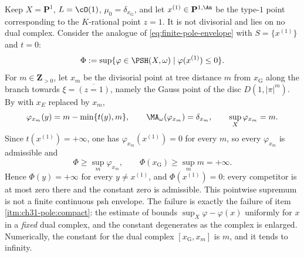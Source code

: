 \begin{example}
\label{ex:ch31-type-one-fails}
Keep $X=\mathbf P^1$, $L=\cO(1)$, $\mu_0=\delta_{x_{\mathrm G}}$, and
let $x^{(1)}\in\mathbf P^{1,\An}$ be the type-$1$ point corresponding to
the $K$-rational point $z=1$.  It is not divisorial and lies on no dual
complex.  Consider the analogue of \eqref{eq:finite-pole-envelope} with
$S=\{x^{(1)}\}$ and $t=0$:
\[
 \Phi:=\sup\{\varphi\in\PSH(X,\omega)\mid\varphi(x^{(1)})\leq0\} .
\]
For $m\in\mathbf Z_{>0}$, let $x_m$ be the divisorial point at tree
distance $m$ from $x_{\mathrm G}$ along the branch towards
$\xi=\overline{(z=1)}$, namely the Gauss point of the disc
$D(1,|\pi|^m)$.  By  with $x_E$ replaced by
$x_m$,
\[
 \varphi_{x_m}(y)=m-\min\{t(y),m\},
 \qquad
 \MA_\omega(\varphi_{x_m})=\delta_{x_m},
 \qquad
 \sup_X\varphi_{x_m}=m .
\]
Since $t(x^{(1)})=+\infty$, one has $\varphi_{x_m}(x^{(1)})=0$ for every
$m$, so every $\varphi_{x_m}$ is admissible and
\[
 \Phi\geq\sup_m\varphi_{x_m},
 \qquad
 \Phi(x_{\mathrm G})\geq\sup_m m=+\infty .
\]
Hence $\Phi(y)=+\infty$ for every $y\neq x^{(1)}$, and
$\Phi(x^{(1)})=0$: every competitor is at most zero there and the
constant zero is admissible.  This pointwise supremum is not a finite
continuous psh envelope.  The failure is exactly the
failure of item \cref{itm:ch31-pole:compact}: the estimate of
 bounds $\sup_X\varphi-\varphi(x)$
uniformly for $x$ in a \emph{fixed} dual complex, and the constant
degenerates as the complex is enlarged.  Numerically, the constant for the
dual complex $[x_{\mathrm G},x_m]$ is $m$, and it tends to infinity.


\end{example}
